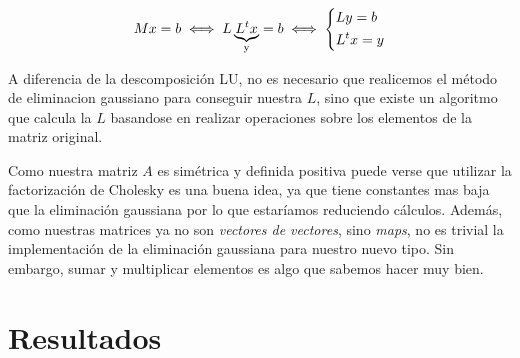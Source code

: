\begin{center}
\[
M x = b \iff L \underbrace{L^t x}_{\text{y}} = b \iff
\begin{dcases}
    L y = b \\
    L^t x = y
\end{dcases}
\]
\end{center}

A diferencia de la descomposición LU, no es necesario que realicemos el método de eliminacion gaussiano para conseguir nuestra $L$, sino que existe un algoritmo que calcula la $L$ basandose en realizar operaciones sobre los elementos de la matriz original.













Como nuestra matriz $A$ es simétrica y definida positiva  puede verse que utilizar la factorización de Cholesky es una buena idea, ya que tiene constantes mas baja que la eliminación gaussiana por lo que estaríamos reduciendo cálculos. Además, como nuestras matrices ya no son \textit{vectores de vectores}, sino \textit{maps},  no es trivial la implementación de la eliminación gaussiana para nuestro nuevo tipo. Sin embargo, sumar y multiplicar elementos es algo que sabemos hacer muy bien. \\




\section{Resultados}

